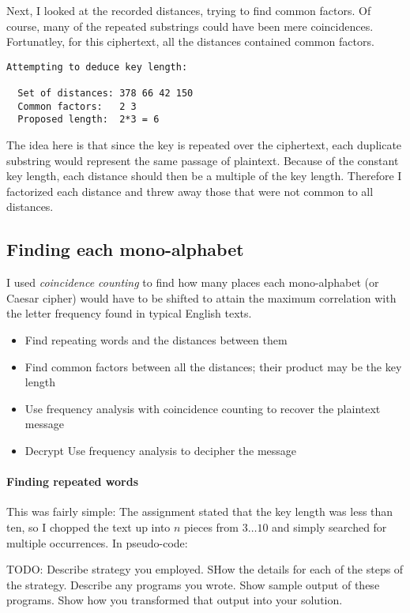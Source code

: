\documentclass[a4paper,english,12pt]{article}
\begin{document}
Next, I looked at the recorded distances, trying to find common factors. Of
course, many of the repeated substrings could have been mere coincidences.
Fortunatley, for this ciphertext, all the distances contained common factors.

\begin{verbatim}
Attempting to deduce key length:

  Set of distances: 378 66 42 150
  Common factors:   2 3
  Proposed length:  2*3 = 6
\end{verbatim}

The idea here is that since the key is repeated over the ciphertext, each
duplicate substring would represent the same passage of plaintext. Because of
the constant key length, each distance should then be a multiple of the key
length. Therefore I factorized each distance and threw away those that were not
common to all distances.


\subsection{Finding each mono-alphabet}

I used \textit{coincidence counting} \cite{coincidence.friedman} to
find how many places each mono-alphabet (or Caesar cipher) would have to be
shifted to attain the maximum correlation with the letter frequency found in
typical English texts.


\begin{itemize}
  \item Find repeating words and the distances between them
  \item Find common factors between all the distances; their product may be the
    key length
  \item Use frequency analysis with coincidence counting to recover the
    plaintext message
  \item Decrypt Use frequency analysis to decipher the message
\end{itemize}

\paragraph{Finding repeated words}

This was fairly simple: The assignment stated that the key length was less than
ten, so I chopped the text up into $n$ pieces from $3\dots10$ and simply
searched for multiple occurrences. In pseudo-code:

TODO: Describe strategy you employed. SHow the details for each of the steps of
the strategy. Describe any programs you wrote. Show sample output of these
programs. Show how you transformed that output into your solution.
\end{document}
